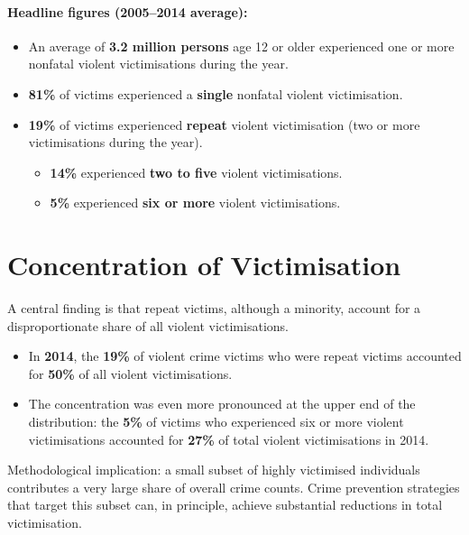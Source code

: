 \documentclass[11pt,a4paper,openany]{report}
\theoremstyle{definition}
\theoremstyle{plain}
\theoremstyle{remark}
\begin{document}
\paragraph{Headline figures (2005--2014 average):}
\begin{itemize}
    \item An average of \textbf{3.2 million persons} age 12 or older experienced one or more nonfatal violent victimisations during the year.
    \item \textbf{81\%} of victims experienced a \textbf{single} nonfatal violent victimisation.
    \item \textbf{19\%} of victims experienced \textbf{repeat} violent victimisation (two or more victimisations during the year).
    \begin{itemize}
        \item \textbf{14\%} experienced \textbf{two to five} violent victimisations.
        \item \textbf{5\%} experienced \textbf{six or more} violent victimisations.
    \end{itemize}
\end{itemize}

\section{Concentration of Victimisation}

A central finding is that repeat victims, although a minority, account for a disproportionate share of all violent victimisations.

\begin{itemize}
    \item In \textbf{2014}, the \textbf{19\%} of violent crime victims who were repeat victims accounted for \textbf{50\%} of all violent victimisations.
    \item The concentration was even more pronounced at the upper end of the distribution: the \textbf{5\%} of victims who experienced six or more violent victimisations accounted for \textbf{27\%} of total violent victimisations in 2014.
\end{itemize}

\begin{keypoint}
Methodological implication: a small subset of highly victimised individuals contributes a very large share of overall crime counts. Crime prevention strategies that target this subset can, in principle, achieve substantial reductions in total victimisation.
\end{keypoint}
\end{document}
